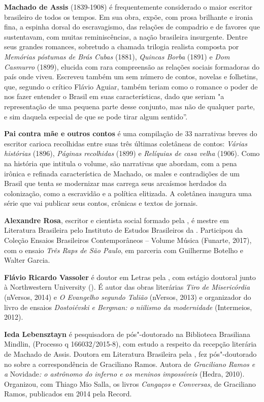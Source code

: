 \textbf{Machado de Assis} (1839-1908) é frequentemente considerado o maior escritor brasileiro de todos os tempos. Em sua obra, expõe, com prosa brilhante e ironia fina, a espinha dorsal do escravagismo, das relações de compadrio e de favores que sustentavam, com muitas reminiscências, a nação brasileira insurgente. Dentre seus grandes romances, sobretudo a chamada trilogia realista composta por \emph{Memórias póstumas de Brás Cubas} (1881), \emph{Quincas Borba} (1891) e \emph{Dom Casmurro} (1899), elucida com rara compreensão as relações sociais formadoras do país onde viveu. Escreveu também um sem número de contos, novelas e folhetins, que, segundo o crítico Flávio Aguiar, também teriam como o romance o poder de nos fazer entender o Brasil em suas características, dado que seriam "a representação de uma pequena parte desse conjunto, mas não de qualquer parte, e sim daquela especial de que se pode tirar algum sentido”.

\textbf{Pai contra mãe e outros contos} é uma compilação de 33 narrativas breves do escritor carioca recolhidas entre suas três últimas coletâneas de contos: \emph{Várias histórias} (1896), \emph{Páginas recolhidas} (1899) e \emph{Relíquias de casa velha} (1906). Como na história que intitula o volume, são narrativas que abordam, com a pena irônica e refinada característica de Machado, os males e contradições de um Brasil que tenta se modernizar mas carrega seus arcaísmos herdados da colonização, como a escravidão e a política elitizada. A coletânea inaugura uma série que vai publicar seus contos, crônicas e textos de jornais.  

\textbf{Alexandre Rosa}, escritor e
  cientista social formado pela , é mestre em Literatura
  Brasileira pelo Instituto de Estudos Brasileiros da . Participou da
  Coleção Ensaios Brasileiros Contemporâneos -- Volume Música (Funarte,
  2017), com o ensaio \emph{Três Raps de São Paulo}, em parceria com
  Guilherme Botelho e Walter Garcia.

\textbf{Flávio Ricardo Vassoler} é doutor em Letras pela , com estágio doutoral junto à
  Northwestern University (). É autor das obras literárias \emph{Tiro
  de Misericórdia} (nVersos, 2014) e \emph{O Evangelho segundo Talião}
  (nVersos, 2013) e organizador do livro de ensaios \emph{Dostoiévski e
  Bergman: o niilismo da modernidade} (Intermeios, 2012).

\textbf{Ieda Lebensztayn} é
  pesquisadora de pós"-doutorado na Biblioteca Brasiliana Mindlin,
   (Processo q 166032/2015-8), com estudo a
  respeito da recepção literária de Machado de Assis. Doutora em
  Literatura Brasileira pela , fez pós"-doutorado no 
  sobre a correspondência de Graciliano Ramos. Autora de
  \emph{Graciliano Ramos e a} Novidade\emph{: o astrônomo do inferno e
  os meninos impossíveis} (Hedra, 2010). Organizou, com Thiago Mio
  Salla, os livros \emph{Cangaços} e \emph{Conversas}, de Graciliano
  Ramos, publicados em 2014 pela Record.





